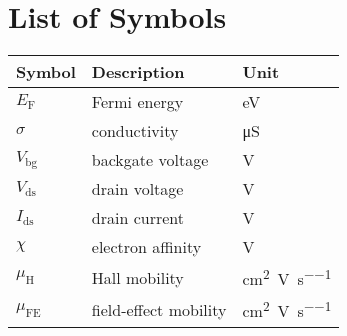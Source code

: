 \chapter*{List of Symbols}
\begin{longtable}[l]{p{125pt} p{150pt} p{150pt}} 
\toprule
\textbf{Symbol}	& \textbf{Description} & \textbf{Unit} \\ 
\midrule
$E_\mathrm{F}$  & Fermi energy & \si{\electronvolt}\\
$\sigma$ & conductivity & \si{\micro\siemens} \\
$V_\mathrm{bg}$ & backgate voltage & \si{\volt}\\
$V_\mathrm{ds}$ & drain voltage & \si{\volt}\\
$I_\mathrm{ds}$ & drain current & \si{\volt}\\
$\chi$ & electron affinity & \si{\volt}\\
$\mu_\mathrm{H}$ & Hall mobility & \si{\cm\squared\per\volt\per\second}\\
$\mu_\mathrm{FE}$ & field-effect mobility & \si{\cm\squared\per\volt\per\second}\\
\bottomrule
\end{longtable}
